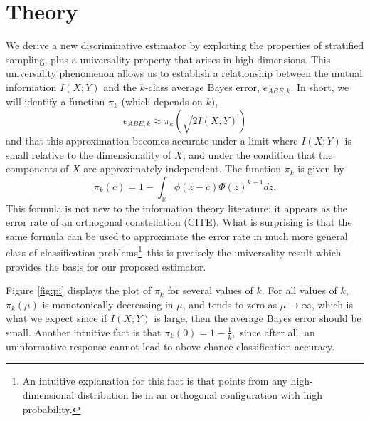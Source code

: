 \documentclass{article}
\begin{document}
\section{Theory}

We derive a new discriminative estimator 
by exploiting the properties of stratified sampling, plus a universality property that arises in high-dimensions.
This universality phenomenon allows us to establish a relationship between the
mutual information $I(X; Y)$ and the $k$-class average Bayes error,
$e_{ABE, k}$.  In short, we will identify a function $\pi_k$
(which depends on $k$),
\begin{equation}\label{abepi}
e_{ABE, k} \approx \pi_k(\sqrt{2 I(X; Y)})
\end{equation}
and that this approximation becomes accurate under a limit where $I(X; Y)$ is small relative to the dimensionality of $X$,
and under the condition that the components of $X$ are approximately independent.
The function $\pi_k$ is given by
\[
\pi_k(c) = 1 - \int_{\mathbb{R}} \phi(z - c)  \Phi(z)^{k-1} dz.
\]
This formula is not new to the information theory literature: it appears as the error rate of an orthogonal constellation (CITE).  What is surprising is that the same formula can be used to approximate the error rate in much more general class of classification problems\footnote{An intuitive explanation for this fact is that points from any high-dimensional distribution lie in an orthogonal configuration with high probability.}--this 
is precisely the universality result which provides the basis for our proposed estimator.

Figure \ref{fig:pi} displays the plot of $\pi_k$ for several values of $k$.
For all values of $k$, $\pi_k(\mu)$ is monotonically decreasing in $\mu$, and tends to zero as $\mu \to \infty$, which is what we expect since if $I(X; Y)$ is large, then the average Bayes error should be small.
Another intuitive fact is that 
$
\pi_k(0) = 1 - \frac{1}{k},
$ since after all, an uninformative response cannot lead to above-chance classification accuracy.
\end{document}
